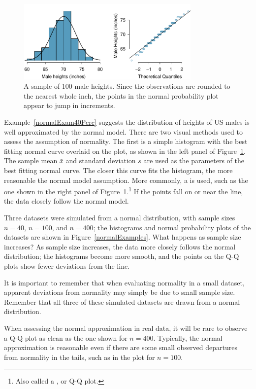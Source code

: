
\begin{figure}[h]
	\centering
	\includegraphics[width=0.8\textwidth]{ch_distributions_oi_biostat/figures/fcidMHeights/fcidMHeights}
	\caption{A sample of 100 male heights. Since the observations are rounded to the nearest whole inch, the points in the normal probability plot appear to jump in increments.}
	\label{fcidMHeights}
\end{figure}

Example~\ref{normalExam40Perc} suggests the distribution of heights of US males is well approximated by the normal model. There are two visual methods used to assess the assumption of normality. The first is a simple histogram with the best fitting normal curve overlaid on the plot, as shown in the left panel of Figure~\ref{fcidMHeights}. The sample mean $\bar{x}$ and standard deviation $s$ are used as the parameters of the best fitting normal curve. The closer this curve fits the histogram, the more reasonable the normal model assumption. More commonly, a  is used, such as the one shown in the right panel of Figure~\ref{fcidMHeights}.\footnote{Also called a , or Q-Q plot.} If the points fall on or near the line, the data closely follow the normal model.

\textD{\newpage}

\begin{examplewrap}
\begin{nexample}{Three datasets were simulated from a normal distribution, with sample sizes $n = 40$, $n = 100$, and $n = 400$; the histograms and normal probability plots of the datasets are shown in Figure~\ref{normalExamples}. What happens as sample size increases?}\label{normalExamplesExample}%
As sample size increases, the data more closely follows the normal distribution; the histograms become more smooth, and the points on the Q-Q plots show fewer deviations from the line.

It is important to remember that when evaluating normality in a small dataset, apparent deviations from normality may simply be due to small sample size. Remember that all three of these simulated datasets are drawn from a normal distribution.

When assessing the normal approximation in real data, it will be rare to observe a Q-Q plot as clean as the one shown for $n = 400$. Typically, the normal approximation is reasonable even if there are some small observed departures from normality in the tails, such as in the plot for $n = 100$.
\end{nexample}
\end{examplewrap}

